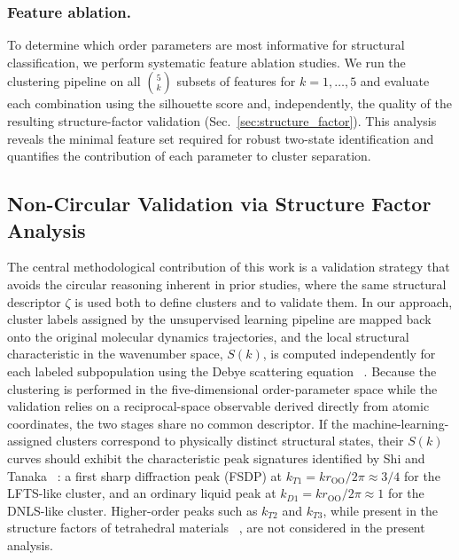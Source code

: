 \documentclass[aps, amsmath,amssymb, reprint, onecolumn,notitlepage,superscriptaddress]{revtex4-2}
\begin{document}
\subsubsection{Feature ablation.}
To determine which order parameters are most informative for structural classification, we perform systematic feature ablation studies. We run the clustering pipeline on all $\binom{5}{k}$ subsets of features for $k = 1, \ldots, 5$ and evaluate each combination using the silhouette score and, independently, the quality of the resulting structure-factor validation (Sec.~\ref{sec:structure_factor}). This analysis reveals the minimal feature set required for robust two-state identification and quantifies the contribution of each parameter to cluster separation.

\subsection{Non-Circular Validation via Structure Factor Analysis}
The central methodological contribution of this work is a validation strategy that avoids the circular reasoning inherent in prior studies, where the same structural descriptor $\zeta$ is used both to define clusters and to validate them. In our approach, cluster labels assigned by the unsupervised learning pipeline are mapped back onto the original molecular dynamics trajectories, and the local structural characteristic in the wavenumber space, $S(k)$, is computed independently for each labeled subpopulation using the Debye scattering equation ~\cite{debye_zerstreuung_1915}. Because the clustering is performed in the five-dimensional order-parameter space while the validation relies on a reciprocal-space observable derived directly from atomic coordinates, the two stages share no common descriptor. If the machine-learning-assigned clusters correspond to physically distinct structural states, their $S(k)$ curves should exhibit the characteristic peak signatures identified by Shi and Tanaka ~\cite{shi_direct_2020}: a first sharp diffraction peak (FSDP) at $k_{T1} = k r_{\text{OO}}/2\pi \approx 3/4$ for the LFTS-like cluster, and an ordinary liquid peak at $k_{D1} = k r_{\text{OO}}/2\pi \approx 1$ for the DNLS-like cluster. Higher-order peaks such as $k_{T2}$ and $k_{T3}$, while present in the structure factors of tetrahedral materials ~\cite{shi-2019}, are not considered in the present analysis.
\end{document}
